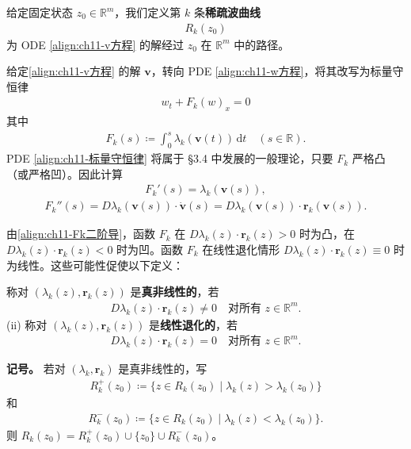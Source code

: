 \documentclass[../../main.tex]{subfiles}
\begin{document}
\begin{definition}\label{definition:ch11-稀疏波曲线}
给定固定状态 $z_0\in\mathbb{R}^m$，我们定义第 $k$ 条\textbf{稀疏波曲线}
\begin{align*}
R_k(z_0)
\end{align*}
为 ODE \eqref{align:ch11-v方程} 的解经过 $z_0$ 在 $\mathbb{R}^m$ 中的路径。
\end{definition}

给定\eqref{align:ch11-v方程} 的解 $\mathbf{v}$，转向 PDE \eqref{align:ch11-w方程}，将其改写为标量守恒律
\begin{align}
w_t+F_k(w)_x=0
\label{align:ch11-标量守恒律}
\end{align}
其中
\begin{align}
F_k(s)\coloneqq\int_0^s\lambda_k(\mathbf{v}(t))\,\mathrm{d}t \quad (s\in\mathbb{R}).
\label{align:ch11-Fk定义}
\end{align}
PDE \eqref{align:ch11-标量守恒律} 将属于 \S3.4 中发展的一般理论，只要 $F_k$ 严格凸（或严格凹）。因此计算
\begin{align}
F_k'(s)=\lambda_k(\mathbf{v}(s)),
\label{align:ch11-Fk一阶导}
\end{align}
\begin{align}
F_k''(s)=D\lambda_k(\mathbf{v}(s))\cdot\dot{\mathbf{v}}(s)=D\lambda_k(\mathbf{v}(s))\cdot\mathbf{r}_k(\mathbf{v}(s)).
\label{align:ch11-Fk二阶导}
\end{align}

由\eqref{align:ch11-Fk二阶导}，函数 $F_k$ 在 $D\lambda_k(z)\cdot\mathbf{r}_k(z)>0$ 时为凸，在 $D\lambda_k(z)\cdot\mathbf{r}_k(z)<0$ 时为凹。函数 $F_k$ 在线性退化情形 $D\lambda_k(z)\cdot\mathbf{r}_k(z)\equiv 0$ 时为线性。这些可能性促使以下定义：

\begin{definition}[i]\label{definition:ch11-真非线性与线性退化} 称对 $(\lambda_k(z),\mathbf{r}_k(z))$ 是\textbf{真非线性的}，若
\begin{align}
D\lambda_k(z)\cdot\mathbf{r}_k(z)\neq 0 \quad \text{对所有 } z\in\mathbb{R}^m.
\label{align:ch11-真非线性}
\end{align}
(ii) 称对 $(\lambda_k(z),\mathbf{r}_k(z))$ 是\textbf{线性退化的}，若
\begin{align}
D\lambda_k(z)\cdot\mathbf{r}_k(z)=0 \quad \text{对所有 } z\in\mathbb{R}^m.
\label{align:ch11-线性退化}
\end{align}
\end{definition}

\textbf{记号。} 若对 $(\lambda_k,\mathbf{r}_k)$ 是真非线性的，写
\begin{align*}
R_k^+(z_0)\coloneqq\{z\in R_k(z_0)\mid\lambda_k(z)>\lambda_k(z_0)\}
\end{align*}
和
\begin{align*}
R_k^-(z_0)\coloneqq\{z\in R_k(z_0)\mid\lambda_k(z)<\lambda_k(z_0)\}.
\end{align*}
则 $R_k(z_0)=R_k^+(z_0)\cup\{z_0\}\cup R_k^-(z_0)$。
\end{document}
